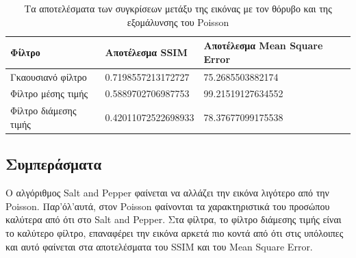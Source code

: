 \begin{table}[H]
  \centering
  \begin{tabular}{| p{2cm} | p{7cm} | p{6.5cm} |}
  \hline
  \textbf{Φίλτρο} & \textbf{Αποτέλεσμα SSIM} & \textbf{Αποτέλεσμα Mean Square Error} \\
  \hline
  Γκαουσιανό φίλτρο & 0.7198557213172727 & 75.2685503882174 \\
  \hline
  Φίλτρο μέσης τιμής & 0.5889702706987753 & 99.21519127634552 \\
  \hline
  Φίλτρο διάμεσης τιμής & 0.42011072522698933 & 78.37677099175538 \\
  \hline
  \end{tabular}
  \caption{Τα αποτελέσματα των συγκρίσεων μετάξυ της εικόνας με τον θόρυβο και της εξομάλυνσης του Poisson}
  \label{tab:results_poisson_noise}
\end{table}

\subsection{Συμπεράσματα}

Ο αλγόριθμος Salt and Pepper φαίνεται να αλλάζει την εικόνα λιγότερο από την Poisson. Παρ'όλ'αυτά, στον Poisson φαίνονται τα χαρακτηριστικά του προσώπου καλύτερα από ότι στο Salt and Pepper.
Στα φίλτρα, το φίλτρο διάμεσης τιμής είναι το καλύτερο φίλτρο, επαναφέρει την εικόνα αρκετά πιο κοντά από ότι στις υπόλοιπες και αυτό φαίνεται στα αποτελέσματα του SSIM και του Mean Square Error.
